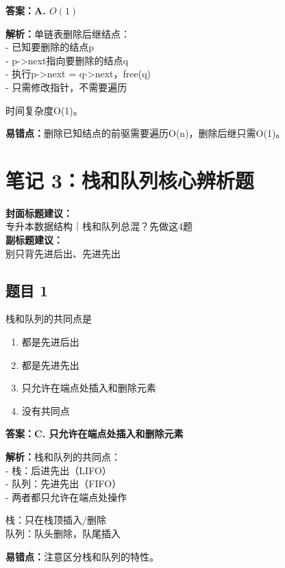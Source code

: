 \documentclass[12pt,a4paper]{ctexart}
\begin{document}
\begin{answerbox}
	\textbf{答案：A. $O(1)$}

	\textbf{解析：}单链表删除后继结点：\\
	- 已知要删除的结点p\\
	- p->next指向要删除的结点q\\
	- 执行p->next = q->next，free(q)\\
	- 只需修改指针，不需要遍历

	时间复杂度O(1)。

	\textbf{易错点：}删除已知结点的前驱需要遍历O(n)，删除后继只需O(1)。
\end{answerbox}

\newpage

\section{笔记 3：栈和队列核心辨析题}
\begin{coverbox}
	\textbf{封面标题建议：}\\
	专升本数据结构｜栈和队列总混？先做这4题\\
	\textbf{副标题建议：}\\
	别只背先进后出、先进先出
\end{coverbox}

\subsection*{题目 1}
栈和队列的共同点是
\begin{enumerate}[label=\Alph*.]
	\item 都是先进后出
	\item 都是先进先出
	\item 只允许在端点处插入和删除元素
	\item 没有共同点
\end{enumerate}

\begin{answerbox}
	\textbf{答案：C. 只允许在端点处插入和删除元素}

	\textbf{解析：}栈和队列的共同点：\\
	- 栈：后进先出（LIFO）\\
	- 队列：先进先出（FIFO）\\
	- 两者都只允许在端点处操作

	栈：只在栈顶插入/删除\\
	队列：队头删除，队尾插入

	\textbf{易错点：}注意区分栈和队列的特性。
\end{answerbox}
\end{document}
